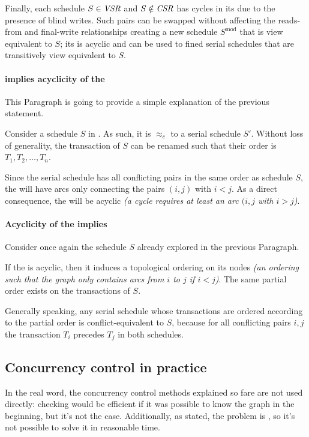 \documentclass[english]{article}
\begin{document}
\bigskip
Finally, each schedule \(S \in \textit{VSR}\) and \(S \notin \textit{CSR}\) has cycles in its \CG due to the presence of blind writes.
Such pairs can be swapped without affecting the reads-from and final-write relationships creating a new schedule \(S^\text{mod}\) that is view equivalent to \(S\);
its \CG is acyclic and can be used to fined serial schedules that are transitively view equivalent to \(S\).

\paragraph{\CSR implies acyclicity of the \CG}

This Paragraph is going to provide a simple explanation of the previous statement.

Consider a schedule \(S\) in \CSR.
As such, it is \(\approx_c\) to a serial schedule \(S'\).
Without loss of generality, the transaction of \(S\) can be renamed such that their order is \(T_1, T_2, \dots, T_n\).

Since the serial schedule has all conflicting pairs in the same order as schedule \(S\), the \CG will have arcs only connecting the pairs \((i, j)\) with \(i < j\).
As a direct consequence, the \CG will be acyclic \textit{(a cycle requires at least an arc \((i, j\) with \(i > j\))}.

\paragraph{Acyclicity of the \CG implies \CSR}

Consider once again the schedule \(S\) already explored in the previous Paragraph.

If the \CG is acyclic, then it induces a topological ordering on its nodes \textit{(an ordering such that the graph only contains arcs from \(i\) to \(j\) if \(i < j\))}.
The same partial order exists on the transactions of \(S\).

Generally speaking, any serial schedule whose transactions are ordered according to the partial order is conflict-equivalent to \(S\), because for all conflicting pairs \(i, j\) the transaction \(T_i\) precedes \(T_j\) in both schedules.

\subsection{Concurrency control in practice}

In the real word, the concurrency control methods explained so fare are not used directly: \CSR checking would be efficient if it was possible to know the graph in the beginning, but it's not the case.
Additionally, as stated, the problem is \NPC, so it's not possible to solve it in reasonable time.
\end{document}
